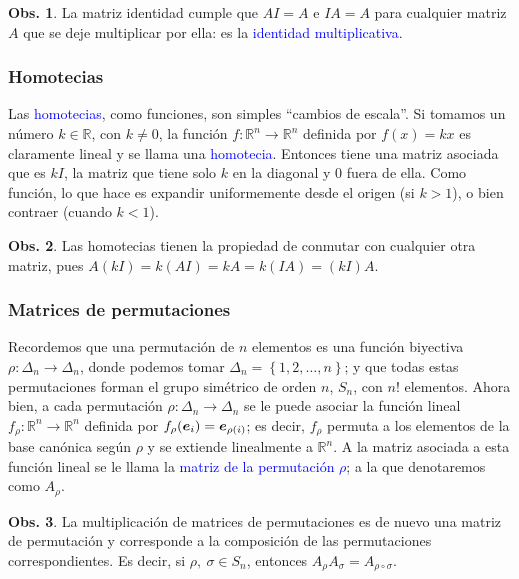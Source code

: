 \documentclass{article}
\theoremstyle{definicion}
\theoremstyle{definition}             %
\theoremstyle{definition}             %
\theoremstyle{definition}
\theoremstyle{definition}
\theoremstyle{observacion}
\newtheorem{obs}{Obs.}
\theoremstyle{definition}
\theoremstyle{plain}
\theoremstyle{definition}
\theoremstyle{afirmacion}
\theoremstyle{notation}
\theoremstyle{definition}
\begin{document}
    \begin{obs}
        La matriz identidad cumple que \(A I = A\) e \(I A = A\) para cualquier matriz \(A\) que se deje multiplicar por ella: es la \textcolor{blue}{identidad multiplicativa}.
    \end{obs}

    \subsubsection*{Homotecias}

    Las \textcolor{blue}{homotecias}, como funciones, son simples ``cambios de escala''. Si tomamos un número \(k \in \mathbb{R}\), con \(k \neq 0\), la función \(f \colon \mathbb{R}^{n} \to \mathbb{R}^{n}\) definida por \(f(x) = kx\) es claramente lineal y se llama una \textcolor{blue}{homotecia}. Entonces tiene una matriz asociada que es \(kI\), la matriz que tiene solo \(k\) en la diagonal y \(0\) fuera de ella. Como función, lo que hace es expandir uniformemente desde el origen (si \(k > 1\)), o bien contraer (cuando \(k < 1\)).

    \begin{obs}
        Las homotecias tienen la propiedad de conmutar con cualquier otra matriz, pues \(A(kI) = k(AI) = kA = k(IA) = (kI)A\).
    \end{obs}

    \subsubsection*{Matrices de permutaciones}

    Recordemos que una permutación de \(n\) elementos es una función biyectiva \(\rho \colon \Delta_{n} \to \Delta_{n}\), donde podemos tomar \(\Delta_{n} = \left\lbrace 1, 2, \dots, n\right\rbrace\); y que todas estas permutaciones forman el grupo simétrico de orden \(n\), \(S_{n}\), con \(n!\) elementos. Ahora bien, a cada permutación \(\rho \colon \Delta_{n} \to \Delta_{n}\) se le puede asociar la función lineal \(f_{\rho} \colon \mathbb{R}^{n} \to \mathbb{R}^{n}\) definida por \(f_{\rho}(\vb*{e}_{i}) = \vb*{e}_{\rho(i)}\); es decir, \(f_{\rho}\) permuta a los elementos de la base canónica según \(\rho\) y se extiende linealmente a \(\mathbb{R}^{n}\). A la matriz asociada a esta función lineal se le llama la \textcolor{blue}{matriz de la permutación \(\rho\)}; a la que denotaremos como \(A_{\rho}\). 

    \begin{obs}
        La multiplicación de matrices de permutaciones es de nuevo una matriz de permutación y corresponde a la composición de las permutaciones correspondientes. Es decir, si \(\rho,\ \sigma \in S_{n}\), entonces \(A_{\rho}A_{\sigma} = A_{\rho \circ \sigma}\).
    \end{obs}
\end{document}
